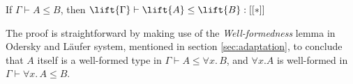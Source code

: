 \begin{theorem}
    If $\Gamma \vdash A \le B$, then $\lift{\Gamma} \vdash \lift{A} \le \lift{B} : [[*]]$
\end{theorem}

The proof is straightforward by making use of the \emph{Well-formedness} lemma
in Odersky and L\"aufer system, mentioned in section \ref{sec:adaptation}, to conclude that
$A$ itself is a well-formed type in $\Gamma \vdash A \le \forall x.\, B$, and
$\forall x. A$ is well-formed in $\Gamma \vdash \forall x. \, A \le B$.


